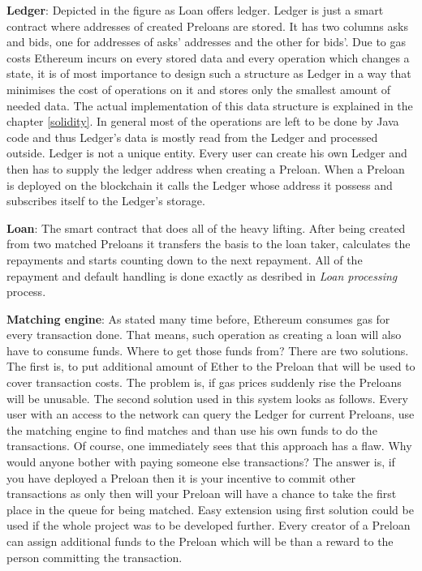 \documentclass[a4paper,12pt,twoside,openany]{report}
\begin{document}
\textbf{Ledger}: Depicted in the figure as Loan offers ledger. Ledger is just a smart contract where addresses of created Preloans are stored. It has two columns asks and bids, one for addresses of asks' addresses and the other for bids'. Due to gas costs Ethereum incurs on every stored data and every operation which changes a state, it is of most importance to design such a structure as Ledger in a way that minimises the cost of operations on it and stores only the smallest amount of needed data. The actual implementation of this data structure is explained in the chapter \ref{solidity}. In general most of the operations are left to be done by Java code and thus Ledger's data is mostly read from the Ledger and processed outside. Ledger is not a unique entity. Every user can create his own Ledger and then has to supply the ledger address when creating a Preloan. When a Preloan is deployed on the blockchain it calls the Ledger whose address it possess and subscribes itself to the Ledger's storage.

\textbf{Loan}: The smart contract that does all of the heavy lifting. After being created from two matched Preloans it transfers the basis to the loan taker, calculates the repayments and starts counting down to the next repayment. All of the repayment and default handling is done exactly as desribed in \textit{Loan processing} process.

\textbf{Matching engine}: As stated many time before, Ethereum consumes gas for every transaction done. That means, such operation as creating a loan will also have to consume funds. Where to get those funds from? There are two solutions. The first is, to put additional amount of Ether to the Preloan that will be used to cover transaction costs. The problem is, if gas prices suddenly rise the Preloans will be unusable. The second solution used in this system looks as follows. Every user with an access to the network can query the Ledger for current Preloans, use the matching engine to find matches and than use his own funds to do the transactions. Of course, one immediately sees that this approach has a flaw. Why would anyone bother with paying someone else transactions? The answer is, if you have deployed a Preloan then it is your incentive to commit other transactions as only then will your Preloan will have a chance to take the first place in the queue for being matched. Easy extension using first solution could be used if the whole project was to be developed further. Every creator of a Preloan can assign additional funds to the Preloan which will be than a reward to the person committing the transaction.
\end{document}

